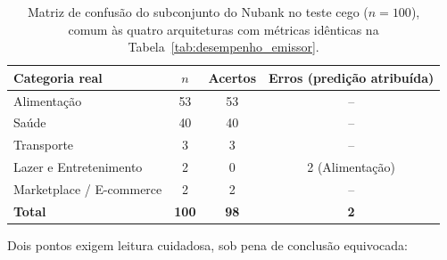 \begin{table}[htb]
	\centering
	\caption{Matriz de confusão do subconjunto do Nubank no teste cego ($n=100$), comum às quatro arquiteturas com métricas idênticas na Tabela~\ref{tab:desempenho_emissor}.}
	\label{tab:confusao_nubank}
	\begin{tabular}{lccc}
		\toprule
		\textbf{Categoria real} & \textbf{$n$} & \textbf{Acertos} & \textbf{Erros (predição atribuída)} \\
		\midrule
		Alimentação & 53 & 53 & -- \\
		Saúde & 40 & 40 & -- \\
		Transporte & 3 & 3 & -- \\
		Lazer e Entretenimento & 2 & 0 & 2 (Alimentação) \\
		Marketplace / E-commerce & 2 & 2 & -- \\
		\midrule
		\textbf{Total} & \textbf{100} & \textbf{98} & \textbf{2} \\
		\bottomrule
	\end{tabular}
\end{table}

Dois pontos exigem leitura cuidadosa, sob pena de conclusão equivocada:

